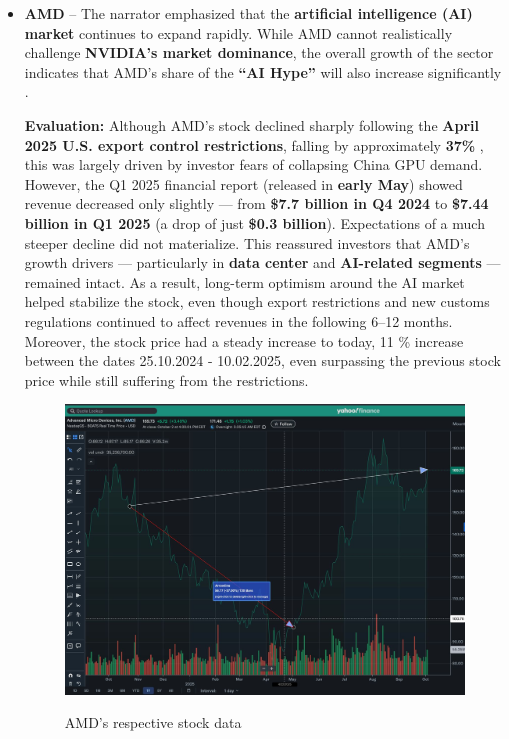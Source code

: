 \documentclass[12pt,a4paper]{article}
\begin{document}
\begin{itemize}
\vspace{1.1cm}

\item \textbf{AMD} -- The narrator emphasized that the \textbf{artificial intelligence (AI) market} continues to expand rapidly.     While AMD cannot realistically challenge \textbf{NVIDIA’s market dominance}, 
    the overall growth of the sector indicates that AMD’s share of the \textbf{“AI Hype”} will also increase significantly \cite{cnbc}.
\vspace{0.3cm}

\textbf{Evaluation:} Although AMD’s stock declined sharply following the \textbf{April 2025 U.S. export control restrictions}, 
falling by approximately \textbf{37\%} \cite{AMD}, this was largely driven by investor fears of collapsing China GPU demand. 
However, the Q1 2025 financial report (released in \textbf{early May}) showed revenue decreased only slightly --- from 
\textbf{\$7.7 billion in Q4 2024}\cite{amdQ42024} to \textbf{\$7.44 billion in Q1 2025} \cite{amdQ1} (a drop of just \textbf{\$0.3 billion}). 
Expectations of a much steeper decline did not materialize. This reassured investors that AMD’s growth drivers --- particularly in \textbf{data center} and \textbf{AI-related segments} --- 
remained intact. As a result, long-term optimism around the AI market helped stabilize the stock, 
even though export restrictions and new customs regulations continued to affect revenues in the following 6--12 months. Moreover, the stock price had a steady increase to today, 11 \% increase between the dates 25.10.2024 - 10.02.2025, even surpassing the previous stock price while still suffering from the restrictions.\cite{AMD}
\newpage

\begin{figure}[H]
    \centering
    \includegraphics[width=0.85\linewidth]{amd.jpeg}
    \caption{AMD's respective stock data}\cite{AMD}
    \label{fig:amd}
\end{figure}
\FloatBarrier
\vspace{1.1cm}


\end{itemize}
\end{document}
